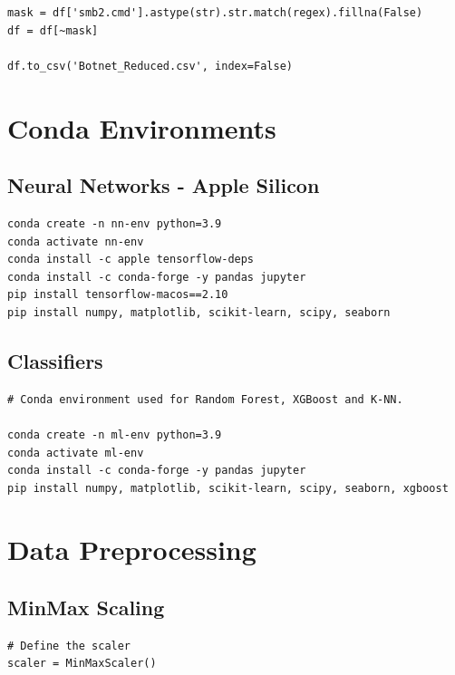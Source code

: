 \begin{appendices}
\begin{lstlisting}
mask = df['smb2.cmd'].astype(str).str.match(regex).fillna(False)
df = df[~mask]

df.to_csv('Botnet_Reduced.csv', index=False)    

\end{lstlisting}

\newpage

\section{Conda Environments}
\label{appx: Conda_Env}

\subsection{Neural Networks - Apple Silicon}

\begin{lstlisting}
conda create -n nn-env python=3.9
conda activate nn-env
conda install -c apple tensorflow-deps
conda install -c conda-forge -y pandas jupyter
pip install tensorflow-macos==2.10
pip install numpy, matplotlib, scikit-learn, scipy, seaborn
\end{lstlisting}

\subsection{Classifiers}

\begin{lstlisting}
# Conda environment used for Random Forest, XGBoost and K-NN.

conda create -n ml-env python=3.9
conda activate ml-env
conda install -c conda-forge -y pandas jupyter
pip install numpy, matplotlib, scikit-learn, scipy, seaborn, xgboost
\end{lstlisting}

\newpage

\section{Data Preprocessing}
\label{appx:Data Processing}

\subsection{MinMax Scaling}
\label{appx:Scaling}

\begin{lstlisting}
# Define the scaler
scaler = MinMaxScaler()


\end{lstlisting}
\end{appendices}
